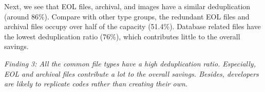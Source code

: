 %

Next, we see that EOL files, archival, and images have a similar deduplication
(around 86\%). 
%
Compare with other type groups, the redundant EOL files and
archival files occupy over half of the capacity (51.4\%). 
% 
Database related files have the lowest deduplication ratio (76\%), which
contributes little to the overall savings.

\textit{Finding 3: All the common file types have a high deduplication ratio.
Especially, EOL and archival files contribute a lot to the overall savings.
Besides, developers are likely to replicate codes rather than creating their
own.}

